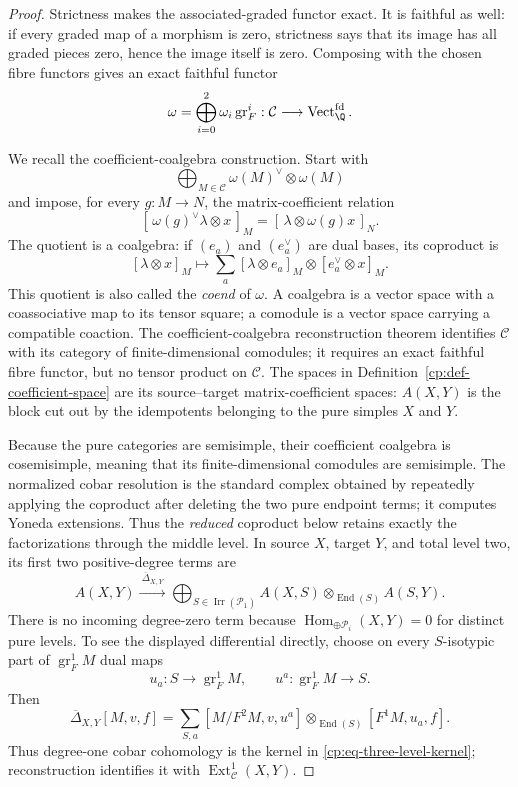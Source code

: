\begin{proof}
Strictness makes the associated-graded functor exact.  It is faithful as
well: if every graded map of a morphism is zero, strictness says that its
image has all graded pieces zero, hence the image itself is zero.  Composing
with the chosen fibre functors gives an exact faithful functor
\[
 \omega=\bigoplus_{i=0}^2\omega_i\operatorname{gr}_F^i:
 \mathcal C\longrightarrow\operatorname{Vect}^{\mathrm{fd}}_\Q.
\]

We recall the coefficient-coalgebra construction.  Start with
\[
 \bigoplus_{M\in\mathcal C}\omega(M)^\vee\otimes\omega(M)
\]
and impose, for every \(g:M\to N\), the matrix-coefficient relation
\[
 [\,\omega(g)^\vee\lambda\otimes x\,]_M
 =
 [\,\lambda\otimes\omega(g)x\,]_N.
\]
The quotient is a coalgebra: if \((e_a)\) and \((e_a^\vee)\) are dual
bases, its coproduct is
\[
 [\lambda\otimes x]_M\longmapsto
 \sum_a[\lambda\otimes e_a]_M\otimes[e_a^\vee\otimes x]_M.
\]
This quotient is also called the \emph{coend} of \(\omega\).  A coalgebra is
a vector space with a coassociative map to its tensor square; a comodule is
a vector space carrying a compatible coaction.  The
coefficient-coalgebra reconstruction theorem identifies
\(\mathcal C\) with its category of finite-dimensional comodules; it
requires an exact faithful fibre functor, but no tensor product on
\(\mathcal C\).  The spaces in
Definition~\ref{cp:def-coefficient-space} are its source--target
matrix-coefficient spaces: \(A(X,Y)\) is the block cut out by the idempotents
belonging to the pure simples \(X\) and \(Y\).

Because the pure categories are semisimple, their coefficient coalgebra is
cosemisimple, meaning that its finite-dimensional comodules are semisimple.
The normalized cobar resolution is the standard complex obtained by
repeatedly applying the coproduct after deleting the two pure endpoint
terms; it computes Yoneda extensions.  Thus the \emph{reduced} coproduct
below retains exactly the factorizations through the middle level.  In
source \(X\), target \(Y\), and
total level two, its first two positive-degree terms are
\[
 A(X,Y)\xrightarrow{\ \overline\Delta_{X,Y}\ }
 \bigoplus_{S\in\operatorname{Irr}(\mathcal P_1)}
 A(X,S)\otimes_{\operatorname{End}(S)}A(S,Y).
\]
There is no incoming degree-zero term because
\(\operatorname{Hom}_{\oplus\mathcal P_i}(X,Y)=0\) for distinct pure
levels.  To see the displayed differential directly, choose on every
\(S\)-isotypic part of \(\operatorname{gr}_F^1M\) dual maps
\[
 u_a:S\longrightarrow\operatorname{gr}_F^1M,\qquad
 u^a:\operatorname{gr}_F^1M\longrightarrow S.
\]
Then
\begin{equation}
 \overline\Delta_{X,Y}[M,v,f]
 =
 \sum_{S,a}
 [M/F^2M,v,u^a]\otimes_{\operatorname{End}(S)}
 [F^1M,u_a,f].
 \label{cp:eq-explicit-middle-coproduct}
\end{equation}
Thus degree-one cobar cohomology is the kernel in
\eqref{cp:eq-three-level-kernel}; reconstruction identifies it with
\(\operatorname{Ext}^1_{\mathcal C}(X,Y)\).
\end{proof}

